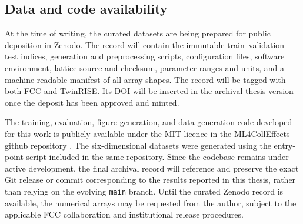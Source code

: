 \subsection{Data and code availability}
\label{subsec:data_code_availability}

At the time of writing, the curated datasets are being prepared for public deposition in Zenodo. The record will contain the immutable train--validation--test indices, generation and preprocessing scripts, configuration files, software environment, lattice source and checksum, parameter ranges and units, and a machine-readable manifest of all array shapes. The record will be tagged with both FCC and TwinRISE. Its DOI will be inserted in the archival thesis version once the deposit has been approved and minted.

The training, evaluation, figure-generation, and data-generation code developed for this work is publicly available under the MIT licence in the ML4CollEffects github repository \cite{martinez_ml4colleffects_2026}. The six-dimensional datasets were generated using the entry-point script included in the same repository. Since the codebase remains under active development, the final archival record will reference and preserve the exact Git release or commit corresponding to the results reported in this thesis, rather than relying on the evolving \texttt{main} branch. Until the curated Zenodo record is available, the numerical arrays may be requested from the author, subject to the applicable FCC collaboration and institutional release procedures.
